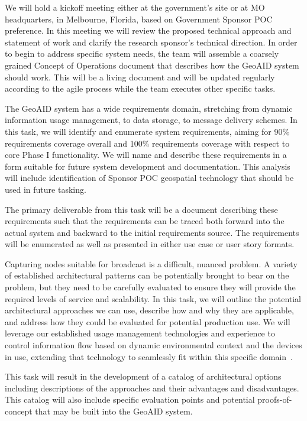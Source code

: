 \documentclass{sbir}
\begin{document}
We will hold a kickoff meeting either at the government's site or at MO headquarters, in Melbourne, Florida, based on Government Sponsor POC preference. In this meeting we will review the proposed technical approach and statement of work and clarify the research sponsor's technical direction. In order to begin to address specific system needs, the team will assemble a coarsely grained Concept of Operations document that describes how the GeoAID system should work. This will be a living document and will be updated regularly according to the agile process while the team executes other specific tasks. 

The GeoAID system has a wide requirements domain, stretching from dynamic information usage management, to data storage, to message delivery schemes. In this task, we will identify and enumerate system requirements, aiming for 90\% requirements coverage overall and 100\% requirements coverage with respect to core Phase I functionality. We will name and describe these requirements in a form suitable for future system development and documentation. This analysis will include identification of Sponsor POC geospatial technology that should be used in future tasking.

The primary deliverable from this task will be a document describing these requirements such that the requirements can be traced both forward into the actual system and backward to the initial requirements source. The requirements will be enumerated as well as presented in either use case or user story formats.

Capturing nodes suitable for broadcast is a difficult, nuanced problem. A variety of established architectural patterns can be potentially brought to bear on the problem, but they need to be carefully evaluated to ensure they will provide the required levels of service and scalability. In this task, we will outline the potential architectural approaches we can use, describe how and why they are applicable, and address how they could be evaluated for potential production use. We will leverage our established usage management technologies and experience to control information flow based on dynamic environmental context and the devices in use, extending that technology to seamlessly fit within this specific domain~\cite{JaLaHe:11,JaLaHe:12}.

This task will result in the development of a catalog of architectural options including descriptions of the approaches and their advantages and disadvantages. This catalog will also include specific evaluation points and potential proofs-of-concept that may be built into the GeoAID system.
\end{document}
